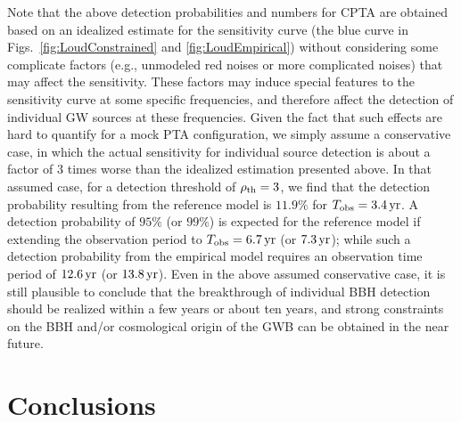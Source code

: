 \documentclass[twocolumn]{aastex631}
\newcommand{\obs}{_{\rm obs}}
\newcommand{\rhoth}{{\rho_{\rm th}}}
\newcommand{\yr}{{\rm\,yr}}
\begin{document}
Note that the above detection probabilities and numbers for CPTA are obtained
based on an idealized estimate for the sensitivity curve (the blue curve
in Figs.~\ref{fig:LoudConstrained} and \ref{fig:LoudEmpirical}) without
considering some complicate factors (e.g., unmodeled red noises or more
complicated noises) that may affect the sensitivity. 
%
These factors may induce special features to the sensitivity curve at some
specific frequencies, and therefore affect the detection of individual GW
sources at these frequencies. Given the fact that such effects are hard to
quantify for a mock PTA configuration, we simply assume a conservative case, in
which the actual sensitivity for individual source detection is about a factor
of $3$ times worse than the idealized estimation presented above.
In that assumed case, for a detection threshold of $\rhoth=3$, we find that the
detection probability resulting from the reference model is $11.9\%$ for
$T\obs=3.4\yr$.
%
A detection probability of $95\%$ (or $99\%$) is expected for the reference
model if extending the observation period to $T\obs=6.7\yr$ (or $7.3\yr$);
while such a detection probability from the empirical model requires an
observation time period of $12.6\yr$ (or $13.8\yr$). 
%
Even in the above assumed conservative case, it is still plausible to conclude
that the breakthrough of individual BBH detection should be realized within a
few years or about ten years, and strong constraints on the BBH and/or
cosmological origin of the GWB can be obtained in the near future. 

\section{Conclusions}
%
\label{sec:Conclusions}
\end{document}
